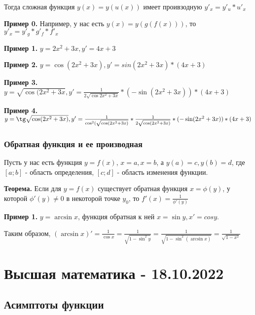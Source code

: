 \documentclass{article}
\begin{document}
\begin{flushleft}
Тогда сложная функция $y(x) = y(u(x))$ имеет проивзодную $y'_x = y'_u * u'_x$

\hfill

\textbf{Пример 0.} Например, у нас есть $y(x) = y(g(f(x)))$, то $y'_x = y'_g * g'_f * f'_x$

\hfill

\textbf{Пример 1.} $y = 2x^2 + 3x, y' = 4x + 3$

\hfill

\textbf{Пример 2.} $y = \cos (2x^2 + 3x), y' = sin (2x^2 + 3x) * (4x + 3)$

\hfill

\textbf{Пример 3.} $y = \sqrt{\cos{(2x^2 + 3x}}, y' = \frac{1}{2\sqrt{\cos{2x^2 + 3x}}} * (-\sin (2x^2 + 3x)) * (4x + 3)$

\hfill

\textbf{Пример 4.} $y = \tg \sqrt{\cos (2x^2 + 3x)}, y' = \frac{1}{\cos^2 (\sqrt{\cos (2x^2 + 3x)}} * \frac{1}{2 \sqrt{\cos (2x^2 + 3x)}} * (-\sin (2x^2 + 3x)) * (4x + 3)$

\subsubsection{Обратная функция и ее производная}

Пусть у нас есть функция $y = f(x)$, $x = a, x = b$, а $y(a) = c, y(b) = d$, где $[a; b]$ - область определения,  $[c; d]$ - область изменения функции.

\hfill

\textbf{Теорема.} Если для $y = f(x)$ существует обратная функция $x = \phi (y)$, у которой $\phi'(y) \ne 0$ в некоторой точке $y_0$, то $f'(x) = \frac{1}{\phi'(y)}$

\hfill

\textbf{Пример 1.} $y = \arcsin x$, функция обратная к ней $x = \sin y, x' = cos y$.

Таким образом, $(\arcsin x)' = \frac{1}{\cos x} = \frac{1}{\sqrt{1 - \sin^2 y}} = \frac{1}{\sqrt{1 - \sin^2(\arcsin x)}} = \frac{1}{\sqrt{1 - x^2}}$

\end{flushleft}

\pagebreak
\section{Высшая математика - 18.10.2022}

\subsection{Асимптоты функции}
\end{document}
